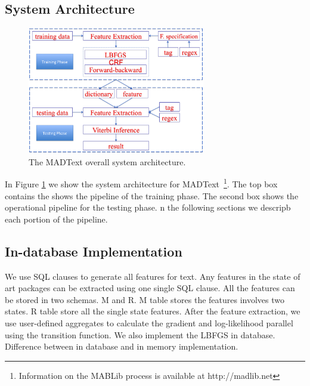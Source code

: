 \documentclass[11pt,letterpaper]{article}
\begin{document}
\subsection{System Architecture}
\begin{figure}
\centering
\includegraphics[height=15em]{system.png}
\caption{The MADText overall system architecture.}
\label{fig:systemarch}
\end{figure}

In Figure \ref{fig:systemarch} we show the system architecture for MADText~\footnote{Information on the MABLib process is available at http://madlib.net}. 
The top box contains the shows  the pipeline of the training phase. 
The second box shows the operational pipeline for the testing phase.
n the following sections we descripb each portion of the pipeline.

\subsection{In-database Implementation}
We use SQL clauses to generate all features for text. Any features in the state of art packages can be extracted using one single SQL clause.
All the features can be stored in two schemas. M and R. M table stores the features involves two states. R table store all the single state features.
After the feature extraction, we use user-defined aggregates to calculate the gradient and log-likelihood parallel using the transition function.
We also implement the LBFGS in database. Difference between in database and in memory implementation.
\end{document}
